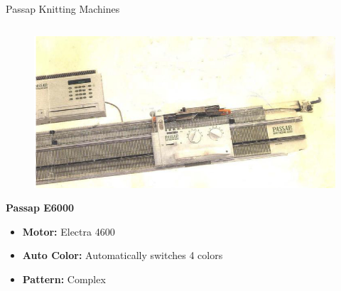 \documentclass[
    NAME={Dr. Helga Ingimundardóttir},
    EMAIL={helgaingim@hi.is},
    FACULTY={Industrial Engineering},
    TITLE={HiDef Textiles: Reviving Tradition with Innovation},
    SUBTITLE={Empowering Creativity and Sustainability in Textile Production through Digital Transformation},
    SEMINAR={Reykjavík DataBeers},
    DATE={January 25, 2025},
    WIDE={true}
]{HI-LaTeX/hi-beamer}
\begin{document}
\begin{frame}{Passap Knitting Machines}
\begin{columns}
            \begin{column}{0.58\textwidth}
                \begin{figure}
                    \includegraphics[height=0.3\textheight]{include/e6000.png}
                \end{figure}
                \textbf{Passap E6000}
                \begin{itemize}
                    \item \textbf{Motor:} Electra 4600
                    \item \textbf{Auto Color:} Automatically switches 4 colors
                    \item \textbf{Pattern:} Complex
                \end{itemize}
            \end{column}

        \end{columns}
    \end{frame}
\end{document}
